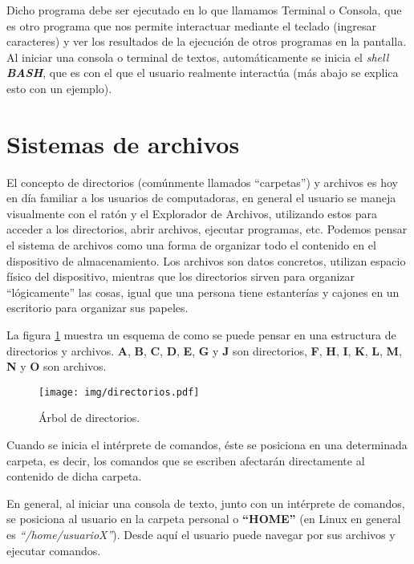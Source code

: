 \documentclass[12pt]{article}
\newcommand{\bash}{\textbf{\emph{BASH}}}
\begin{document}
Dicho programa debe ser ejecutado en lo que llamamos Terminal o Consola, que
es otro programa que nos permite interactuar mediante el teclado (ingresar
caracteres) y ver los resultados de la ejecución de otros programas en la
pantalla. Al iniciar una consola o terminal de textos, automáticamente se
inicia el \emph{shell} \bash, que es con el que el usuario realmente
interactúa (más abajo se explica esto con un ejemplo).

\section{Sistemas de archivos}

El concepto de directorios (comúnmente llamados ``carpetas'') y archivos es hoy
en día familiar a los usuarios de computadoras, en general el usuario se maneja
visualmente con el ratón y el Explorador de Archivos, utilizando estos para
acceder a los directorios, abrir archivos, ejecutar programas, etc. Podemos
pensar el sistema de archivos como una forma de organizar todo el contenido en
el dispositivo de almacenamiento. Los archivos son datos concretos, utilizan
espacio físico del dispositivo, mientras que los directorios sirven para
organizar ``lógicamente'' las cosas, igual que una persona tiene estanterías y
cajones en un escritorio para organizar sus papeles.

La figura \ref{arbolDirectorios} muestra un esquema de como se puede pensar en
una estructura de directorios y archivos. \textbf{A}, \textbf{B}, \textbf{C},
\textbf{D}, \textbf{E}, \textbf{G} y \textbf{J} son directorios, \textbf{F},
\textbf{H}, \textbf{I}, \textbf{K}, \textbf{L}, \textbf{M}, \textbf{N} y
\textbf{O} son archivos.

\begin{figure}[!htb]

	\centering

	\texttt{[image: img/directorios.pdf]}

	\caption{Árbol de directorios.}

	\label{arbolDirectorios}

\end{figure}

Cuando se inicia el intérprete de comandos, éste se posiciona en una
determinada carpeta, es decir, los comandos que se escriben afectarán
directamente al contenido de dicha carpeta.

En general, al iniciar una consola de texto, junto con un intérprete de
comandos, se posiciona al usuario en la carpeta personal o \textbf{``HOME''}
(en Linux en general es \emph{``/home/usuarioX''}). Desde aquí el usuario
puede navegar por sus archivos y ejecutar comandos.
\end{document}
